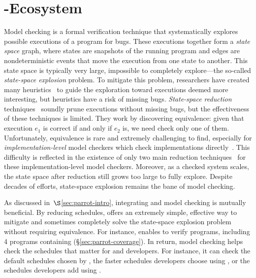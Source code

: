\section{\parrot-\dbug Ecosystem} \label{sec:parrot-mc}



Model checking is a formal verification technique that systematically
explores possible executions of a program for bugs.  These executions
together form a \emph{state space} graph, where states are snapshots of the
running program and edges are nondeterministic events that move the
execution from one state to another.  This state space is typically very
large, impossible to completely explore---the so-called \emph{state-space
  explosion} problem.  To mitigate this problem, researchers have created
many heuristics~\cite{yang:fisc:osdi,musuvathi:aodv,killian:macemc:nsdi07} to guide the exploration toward executions
deemed more interesting, but heuristics have a risk of missing bugs.
\emph{State-space reduction} techniques~\cite{flanagan:dynamicpo,godefroid:verisoft,demeter:sosp11} soundly prune
executions without missing bugs, but the effectiveness of these techniques
is limited.  They work by discovering equivalence: given
that execution $e_1$ is correct if and only if $e_2$ is, we need check only
one of them. Unfortunately, equivalence is rare and extremely challenging
to find, especially for \emph{implementation-level} model checkers which
check implementations directly~\cite{godefroid:verisoft,musuvathi:aodv,yang:fisc:osdi,yang:explode:osdi,killian:macemc:nsdi07,dbug:spin11}.
This difficulty is reflected in the existence of only two main reduction
techniques~\cite{flanagan:dynamicpo, demeter:sosp11} for these implementation-level model
checkers.  Moreover, as a checked system scales, the state space after
reduction still grows too large to fully explore.  Despite
decades of efforts, state-space explosion remains the bane of model
checking.

As discussed in~$\S$\ref{sec:parrot-intro}, integrating \smt and model checking is
mutually beneficial.  By reducing schedules, \smt offers an extremely
simple, effective way to mitigate and sometimes completely solve the
state-space explosion problem without requiring equivalence.  For
instance, \parrot enables \dbug to verify \nprogverifiedxxx programs,
including 4 programs containing \nondets (\S\ref{sec:parrot-coverage}).
In return, model
checking helps check the schedules that matter for \parrot and developers.
For instance, it can check the default schedules chosen by \parrot, the
faster schedules developers choose using \computes, or the schedules
developers add using \nondets.

